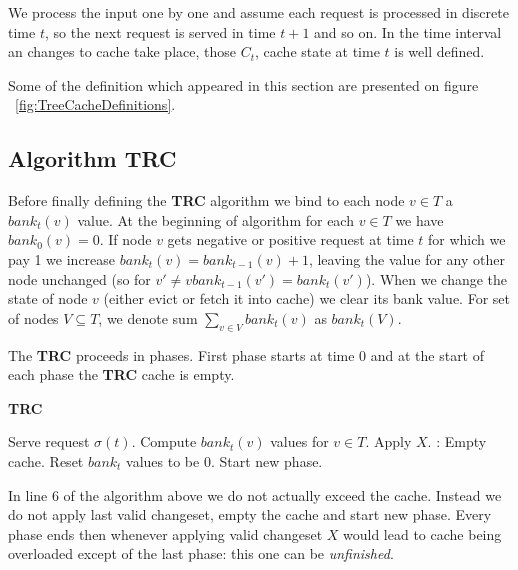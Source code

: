 We process the input one by one and assume each request is processed in 
discrete time $t$, so the next request is served in time $t + 1$ and so on. In 
the time interval an changes to cache take place, those $C_t$, cache state at 
time $t$ is well defined.

Some of the definition which appeared in this section are presented on figure 
~\ref{fig:TreeCacheDefinitions}.

\subsection{Algorithm TRC}

Before finally defining the \textbf{TRC} algorithm we bind to each node $v \in 
T$ a $bank_{t}(v)$ value. At the beginning of algorithm for each $v \in T$ we 
have $bank_{0}(v) = 0$. If node $v$ gets negative or positive request at 
time $t$ for which we pay 1 we increase $bank_{t}(v) = bank_{t-1}(v) + 1$, 
leaving the value for any other node unchanged (so for $v' \neq v 
bank_{t-1}(v') = bank_{t}(v')$). When we change the state of node $v$ (either 
evict or fetch it into cache) we clear its bank value. For set of nodes $V 
\subseteq T$, we denote sum $\sum_{v \in V} bank_{t}(v)$ as $bank_{t}(V)$.

The \textbf{TRC} proceeds in phases. First phase starts at time 0 and at the 
start of each phase the \textbf{TRC} cache is empty. 
\begin{algorithm}
\caption{\textbf{TRC}}
\begin{algorithmic}[1]
  \State Serve request $\sigma(t)$.
  \State Compute $bank_t(v)$ values for $v \in T$.
 \State Apply $X$.
 :
  \State Empty cache.
  \State Reset $bank_t$ values to be 0.
  \State Start new phase.
 \EndIf
 \EndIf
\EndFor
  \end{algorithmic}
\end{algorithm}

In line 6 of the algorithm above we do not actually exceed the cache. Instead 
we do not apply last valid changeset, empty the cache and start new phase. 
Every phase ends then whenever applying valid changeset $X$ would lead to cache 
being overloaded except of the last phase: this one can be \textit{unfinished}.
